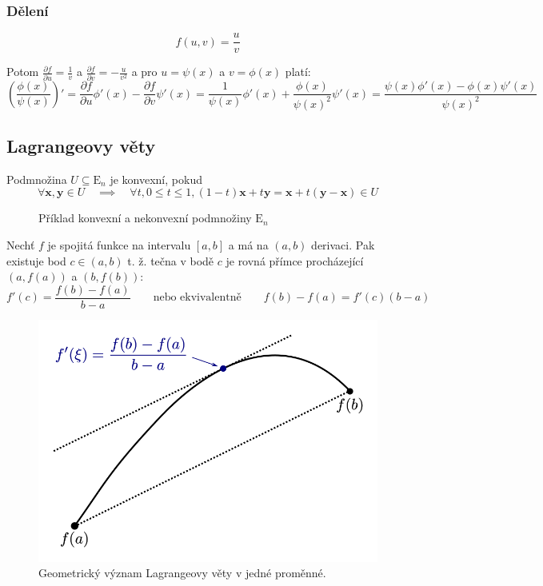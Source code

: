 \documentclass[../main.tex]{subfiles}
\begin{document}
\subsubsection{Dělení}
\[ f(u,v) = \frac{u}{v} \]

Potom $ \frac{\partial f}{\partial u} = \frac{1}{v} $ a $ \frac{\partial f}{\partial v} = -\frac{u}{v^2} $
a pro $u = \psi (x)$ a $ v = \phi (x) $ platí:
\[ \left( \frac{\phi (x)}{\psi (x)} \right)' =
\frac{\partial f}{\partial u} \phi '(x) - \frac{\partial f}{\partial v} \psi '(x) =
\frac{1}{\psi (x)} \phi '(x) + \frac{\phi (x)}{\psi (x)^2}\psi '(x) =
\frac{\psi (x)\phi '(x) - \phi (x)\psi '(x)}{\psi (x)^2} \]

\subsection{Lagrangeovy věty}
\begin{definition}
	Podmnožina $U \subseteq \mathrm{E}_n$ je konvexní, pokud
	$$\forall \mathbf{x}, \mathbf{y} \in U \quad \implies \quad \forall t, 0 \le t \le 1, (1 - t) \mathbf{x} + t \mathbf{y} = \mathbf{x} + t( \mathbf{y} - \mathbf{x}) \in U$$
\end{definition}

\begin{figure}[h]
	\centering
	\hspace{5em}
	\caption{Příklad konvexní a nekonvexní podmnožiny $\mathrm{E}_n$}%
\end{figure}

\begin{theorem}
	Nechť $f$ je spojitá funkce na intervalu $[a, b]$ a má na $(a, b)$ derivaci. Pak existuje bod $c \in (a, b)$ t. ž. tečna v bodě $c$ je rovná přímce procházející $(a, f(a))$ a $(b, f(b))$: $$f'(c) = \frac{f(b) - f(a)}{b - a} \qquad \text{nebo ekvivalentně} \qquad f(b) - f(a) = f'(c)(b - a)$$
\end{theorem}

\begin{figure}[h]
	\centering
	\includegraphics[width=0.5\linewidth]{02-lagrange}%
	\caption{Geometrický význam Lagrangeovy věty v jedné proměnné.}%
	\label{fig:par}
\end{figure}
\end{document}
